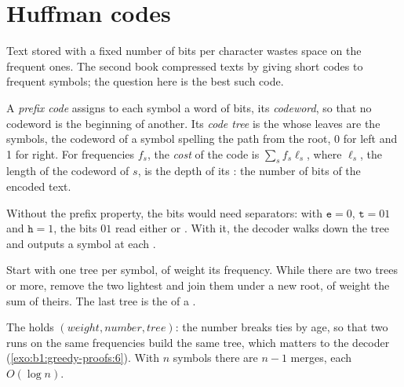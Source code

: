 \section{Huffman codes}\label{sec:b1:greedy-proofs:huffman}

Text stored with a fixed number of bits per character wastes space on the frequent ones. The second book compressed
texts by giving short codes to frequent symbols; the question here is the best such code.

\begin{definition}\label{def:b1:greedy-proofs:prefix-code}
A \emph{prefix code} assigns to each symbol a word of bits, its \emph{codeword}, so that no codeword is
the beginning of another. Its \emph{code tree} is the  whose leaves are the symbols, the
codeword of a symbol spelling the path from the root, 0 for left and 1 for right. For frequencies $f_s$, the
\emph{cost} of the code is $\sum_s f_s \ell_s$, where $\ell_s$, the length of the codeword of
$s$, is the depth of its : the number of bits of the encoded text.
\end{definition}

Without the prefix property, the bits would need separators: with $\mathtt{e} = 0$, $\mathtt{t} = 01$ and
$\mathtt{h} = 1$, the bits $01$ read either  or . With it, the decoder walks down the tree and outputs
a symbol at each .

\begin{method}\label{met:b1:greedy-proofs:huffman}
Start with one tree per symbol, of weight its frequency. While there are two trees or more, remove the two lightest
and join them under a new root, of weight the sum of theirs. The last tree is the  of a \emph{}.
\end{method}

\label{lst:b1:greedy-proofs:huffman}

The  holds $(\mathit{weight}, \mathit{number}, \mathit{tree})$: the number breaks ties by age, so that two
runs on the same frequencies build the same tree, which matters to the decoder (\cref{exo:b1:greedy-proofs:6}). With $n$
symbols there are $n - 1$ merges, each $O(\log n)$.

